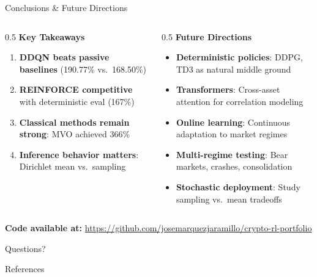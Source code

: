 \documentclass[aspectratio=169]{beamer}
\begin{document}
\begin{frame}{Conclusions \& Future Directions}
\small

\begin{columns}[T,totalwidth=\textwidth]
\begin{column}{0.5\textwidth}
\textbf{Key Takeaways}
\begin{enumerate}\setlength{\itemsep}{5pt}
  \item \textbf{DDQN beats passive baselines} (190.77\% vs.\ 168.50\%)
  \item \textbf{REINFORCE competitive} with deterministic eval (167\%)
  \item \textbf{Classical methods remain strong}: MVO achieved 366\%
  \item \textbf{Inference behavior matters}: Dirichlet mean vs.\ sampling
\end{enumerate}
\end{column}

\begin{column}{0.5\textwidth}
\textbf{Future Directions}
\begin{itemize}\setlength{\itemsep}{4pt}
  \item \textbf{Deterministic policies}: DDPG, TD3 as natural middle ground
  \item \textbf{Transformers}: Cross-asset attention for correlation modeling
  \item \textbf{Online learning}: Continuous adaptation to market regimes
  \item \textbf{Multi-regime testing}: Bear markets, crashes, consolidation
  \item \textbf{Stochastic deployment}: Study sampling vs.\ mean tradeoffs
\end{itemize}
\end{column}
\end{columns}

\vspace{0.5em}
\centering
\textbf{Code available at:} \url{https://github.com/josemarquezjaramillo/crypto-rl-portfolio}

\end{frame}

\begin{frame}[standout]
Questions?
\end{frame}

\begin{frame}[allowframebreaks]{References}
\footnotesize

\end{frame}
\end{document}
